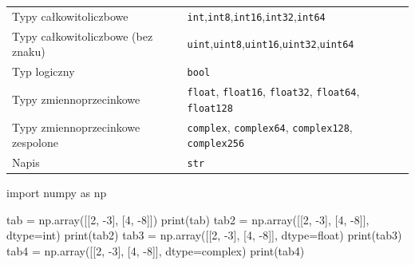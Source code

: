 \documentclass[
  polish,
  letterpaper,
  DIV=11,
  numbers=noendperiod]{scrreprt}
\newenvironment{Shaded}{\begin{snugshade}}{\end{snugshade}}
\newcommand{\BuiltInTok}[1]{\textcolor[rgb]{0.00,0.23,0.31}{#1}}
\newcommand{\DecValTok}[1]{\textcolor[rgb]{0.68,0.00,0.00}{#1}}
\newcommand{\ImportTok}[1]{\textcolor[rgb]{0.00,0.46,0.62}{#1}}
\newcommand{\NormalTok}[1]{\textcolor[rgb]{0.00,0.23,0.31}{#1}}
\newcommand{\OperatorTok}[1]{\textcolor[rgb]{0.37,0.37,0.37}{#1}}
\newcounter{none} %
\begin{document}
{\def\LTcaptype{none} %
\begin{longtable}[]{@{}
  >{\raggedright\arraybackslash}p{}
  >{\raggedright\arraybackslash}p{}@{}}
\toprule\noalign{}
\endhead
\bottomrule\noalign{}
\endlastfoot
Typy całkowitoliczbowe &
\texttt{int},\texttt{int8},\texttt{int16},\texttt{int32},\texttt{int64} \\
Typy całkowitoliczbowe (bez znaku) &
\texttt{uint},\texttt{uint8},\texttt{uint16},\texttt{uint32},\texttt{uint64} \\
Typ logiczny & \texttt{bool} \\
Typy zmiennoprzecinkowe & \texttt{float}, \texttt{float16},
\texttt{float32}, \texttt{float64}, \texttt{float128} \\
Typy zmiennoprzecinkowe zespolone & \texttt{complex},
\texttt{complex64}, \texttt{complex128}, \texttt{complex256} \\
Napis & \texttt{str} \\
\end{longtable}
}

\begin{Shaded}
\begin{Highlighting}[]
\ImportTok{import}\NormalTok{ numpy }\ImportTok{as}\NormalTok{ np}

\NormalTok{tab }\OperatorTok{=}\NormalTok{ np.array([[}\DecValTok{2}\NormalTok{, }\OperatorTok{{-}}\DecValTok{3}\NormalTok{], [}\DecValTok{4}\NormalTok{, }\OperatorTok{{-}}\DecValTok{8}\NormalTok{]])}
\BuiltInTok{print}\NormalTok{(tab)}
\NormalTok{tab2 }\OperatorTok{=}\NormalTok{ np.array([[}\DecValTok{2}\NormalTok{, }\OperatorTok{{-}}\DecValTok{3}\NormalTok{], [}\DecValTok{4}\NormalTok{, }\OperatorTok{{-}}\DecValTok{8}\NormalTok{]], dtype}\OperatorTok{=}\BuiltInTok{int}\NormalTok{)}
\BuiltInTok{print}\NormalTok{(tab2)}
\NormalTok{tab3 }\OperatorTok{=}\NormalTok{ np.array([[}\DecValTok{2}\NormalTok{, }\OperatorTok{{-}}\DecValTok{3}\NormalTok{], [}\DecValTok{4}\NormalTok{, }\OperatorTok{{-}}\DecValTok{8}\NormalTok{]], dtype}\OperatorTok{=}\BuiltInTok{float}\NormalTok{)}
\BuiltInTok{print}\NormalTok{(tab3)}
\NormalTok{tab4 }\OperatorTok{=}\NormalTok{ np.array([[}\DecValTok{2}\NormalTok{, }\OperatorTok{{-}}\DecValTok{3}\NormalTok{], [}\DecValTok{4}\NormalTok{, }\OperatorTok{{-}}\DecValTok{8}\NormalTok{]], dtype}\OperatorTok{=}\BuiltInTok{complex}\NormalTok{)}
\BuiltInTok{print}\NormalTok{(tab4)}
\end{Highlighting}
\end{Shaded}
\end{document}
